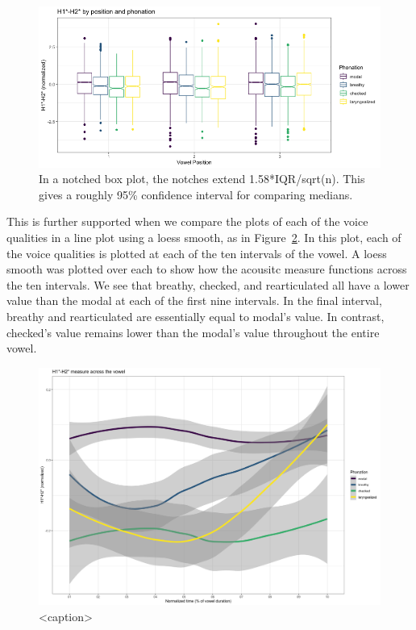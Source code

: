 \documentclass[12pt, letterpaper]{article}
\begin{document}
\begin{figure}[!h]
  \centering
  \includegraphics[width = \linewidth]{Images/h1h2_boxplot.png}
  \caption{In a notched box plot, the notches extend 1.58*IQR/sqrt(n). This gives a roughly 95\% confidence interval for comparing medians.}
  \label{fig:H1H2_box}
\end{figure}

This is further supported when we compare the plots of each of the voice qualities in a line plot using a loess smooth, as in Figure~\ref*{fig:H1H2_line}. In this plot, each of the voice qualities is plotted at each of the ten intervals of the vowel. A loess smooth was plotted over each to show how the acousitc measure functions across the ten intervals. We see that breathy, checked, and rearticulated all have a lower value than the modal at each of the first nine intervals. In the final interval, breathy and rearticulated are essentially equal to modal's value. In contrast, checked's value remains lower than the modal's value throughout the entire vowel. 

\begin{figure}[htbp]
  \centering
  \includegraphics[width = \linewidth]{Images/h1h2_line.png}
  \caption{<caption>}
  \label{fig:H1H2_line}
\end{figure}
\end{document}
